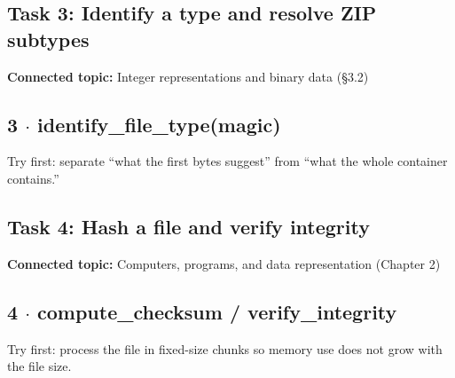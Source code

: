 \documentclass[11pt]{article}
\begin{document}
\begin{keepsection}
\section{Task 3: Identify a type and resolve ZIP subtypes}

\textbf{Connected topic:} Integer representations and binary data (§3.2)

\begin{keepsection}
\subsection{3 \ensuremath{\cdot} identify\_file\_type(magic)}

Try first: separate “what the first bytes suggest” from “what the whole container contains.”

\end{keepsection}
\end{keepsection}

\begin{keepsection}
\section{Task 4: Hash a file and verify integrity}

\textbf{Connected topic:} Computers, programs, and data representation (Chapter 2)

\begin{keepsection}
\subsection{4 \ensuremath{\cdot} compute\_checksum / verify\_integrity}

Try first: process the file in fixed-size chunks so memory use does not grow with the file size.

\end{keepsection}
\end{keepsection}
\end{document}
